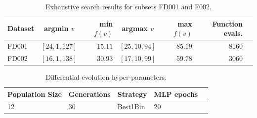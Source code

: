 \documentclass[12pt]{IEEEtran}%
\begin{document}
\begin{table}
\begin{center}
\caption{Exhaustive search results for subsets FD001 and F002.}%
%
\begin{tabular}
[c]{l|crcrrl}\hline
Dataset & argmin $v$ & min $f(v)$ & argmax $v$ & max $f(v)$ & Function
evals. & \\\hline\hline
FD001 & $\left[  24, 1, 127 \right]  $ & $15.11$ & $\left[  25, 10, 94
\right]  $ & $85.19$ & 8160 & \\
FD002 & $\left[  16, 1, 138 \right]  $ & $30.93$ & $\left[  17, 10, 99
\right]  $ & $59.78$ & 3060 & \\\hline
\end{tabular}
%
\label{table:true_optimal_data_params}%
\end{center}
\end{table}


\begin{table}
\begin{center}
\caption{Differential evolution hyper-parameters.}%
%
\begin{tabular}
[c]{lllll}\hline
Population Size & Generations & Strategy & MLP epochs & \\\hline
12 & 30 & Best1Bin & 20 & \\\hline
\end{tabular}
%
\label{table:de_hyperparams}%
\end{center}
\end{table}
\end{document}
